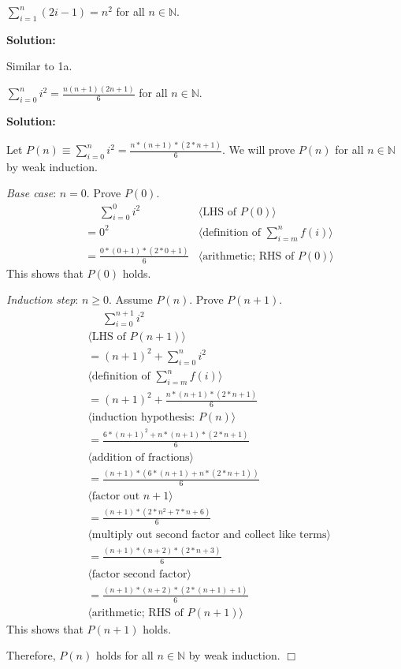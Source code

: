 \documentclass[11pt,fleqn]{article}
\newcommand{\sglsp}{\ }
\newenvironment{proof}{\par\noindent{\bf Proof\sglsp}}{\hfill$\Box$}
\newcommand{\pnote}[1]{{\langle \text{#1} \rangle}}
\begin{document}
\medskip

    \item $\sum^{n}_{i=1}(2i - 1) = n^2$  for all $n \in \mathbb{N}$.

\medskip

\textbf{Solution:}

\medskip

Similar to 1a.

\medskip

    \item $\sum^{n}_{i=0}i^2 = \frac{n(n+1)(2n + 1)}{6}$ for all
      $n \in \mathbb{N}$.

\medskip

\textbf{Solution:}

\medskip

\begin{proof}
Let $P(n) \equiv \sum^{n}_{i=0}i^2 = \frac{n*(n+1)*(2*n + 1)}{6}$.  We will prove $P(n)$
for all $n \in \mathbb{N}$ by weak induction.

\medskip

\emph{Base case}: $n = 0$.  Prove $P(0)$.
\begin{align*}
  &\phantom{{}=} \sum^{0}_{i=0}i^2 & \pnote{LHS of $P(0)$}\\
  &= 0^2 & \pnote{definition of $\textstyle{\sum}_{i=m}^{n}f(i)$}\\
  &= \frac{0*(0+1)*(2*0 + 1)}{6} & \pnote{arithmetic; RHS of $P(0)$}
\end{align*}
This shows that $P(0)$ holds.

\medskip

\emph{Induction step}: $n \ge 0$.  Assume $P(n)$. Prove $P(n + 1)$.
\begin{align*}
  &\phantom{{}=} \sum^{n+1}_{i=0}i^2\\
    & \pnote{LHS of $P(n + 1)$}\\
  &= (n + 1)^2 + \sum^{n}_{i=0}i^2\\
    &\pnote{definition of $\sum_{i=m}^{n}f(i)$}\\
  &= (n + 1)^2 + \frac{n*(n+1)*(2*n + 1)}{6}\\
    &\pnote{induction hypothesis: $P(n)$}\\
  &= \frac{6*(n + 1)^2 + n*(n+1)*(2*n + 1)}{6}\\
    &\pnote{addition of fractions}\\
  &= \frac{(n + 1)*(6*(n +1) + n*(2*n +1))}{6}\\
    &\pnote{factor out $n + 1$}\\
  &= \frac{(n + 1)*(2*n^2 + 7*n + 6)}{6}\\
    &\pnote{multiply out second factor and collect like terms}\\
  &= \frac{(n + 1)*(n + 2)*(2*n + 3)}{6}\\
    &\pnote{factor second factor}\\
  &= \frac{(n + 1)*(n + 2)*(2*(n + 1) +1)}{6}\\
    &\pnote{arithmetic; RHS of $P(n + 1)$}
\end{align*}
This shows that $P(n + 1)$ holds.

\medskip

Therefore, $P(n)$ holds for all $n \in \mathbb{N}$ by weak induction.
\end{proof}
\end{document}
